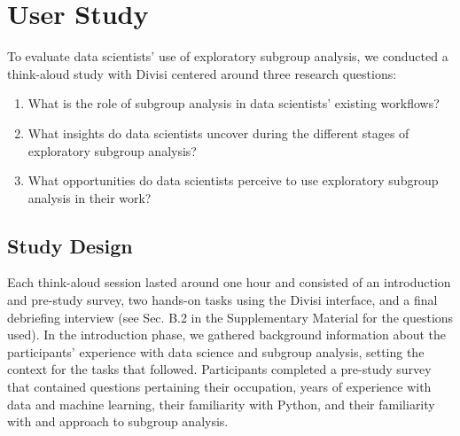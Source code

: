 \section{User Study}
\label{sec:user-study}

To evaluate data scientists' use of exploratory subgroup analysis, we conducted a think-aloud study with Divisi centered around three research questions:
\begin{enumerate}
\item What is the role of subgroup analysis in data scientists’ existing workflows?
\item What insights do data scientists uncover during the different stages of exploratory subgroup analysis?
\item What opportunities do data scientists perceive to use exploratory subgroup analysis in their work?
\end{enumerate}

\subsection{Study Design}

Each think-aloud session lasted around one hour and consisted of an introduction and pre-study survey, two hands-on tasks using the Divisi interface, and a final debriefing interview (see Sec. B.2 in the Supplementary Material for the questions used). 
In the introduction phase, we gathered background information about the participants’ experience with data science and subgroup analysis, setting the context for the tasks that followed. Participants completed a pre-study survey that contained questions pertaining their occupation, years of experience with data and machine learning, their familiarity with Python, and their familiarity with and approach to subgroup analysis. 

